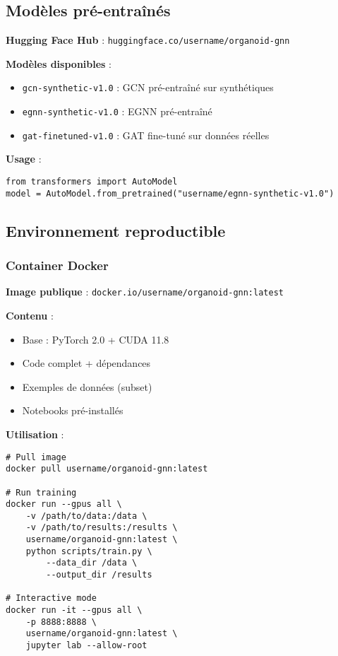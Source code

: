 \subsection{Modèles pré-entraînés}

\textbf{Hugging Face Hub} : \texttt{huggingface.co/username/organoid-gnn}

\textbf{Modèles disponibles} :
\begin{itemize}
    \item \texttt{gcn-synthetic-v1.0} : GCN pré-entraîné sur synthétiques
    \item \texttt{egnn-synthetic-v1.0} : EGNN pré-entraîné
    \item \texttt{gat-finetuned-v1.0} : GAT fine-tuné sur données réelles
\end{itemize}

\textbf{Usage} :
\begin{verbatim}
from transformers import AutoModel
model = AutoModel.from_pretrained("username/egnn-synthetic-v1.0")
\end{verbatim}

\subsection{Environnement reproductible}

\subsubsection{Container Docker}

\textbf{Image publique} : \texttt{docker.io/username/organoid-gnn:latest}

\textbf{Contenu} :
\begin{itemize}
    \item Base : PyTorch 2.0 + CUDA 11.8
    \item Code complet + dépendances
    \item Exemples de données (subset)
    \item Notebooks pré-installés
\end{itemize}

\textbf{Utilisation} :
\begin{verbatim}
# Pull image
docker pull username/organoid-gnn:latest

# Run training
docker run --gpus all \
    -v /path/to/data:/data \
    -v /path/to/results:/results \
    username/organoid-gnn:latest \
    python scripts/train.py \
        --data_dir /data \
        --output_dir /results

# Interactive mode
docker run -it --gpus all \
    -p 8888:8888 \
    username/organoid-gnn:latest \
    jupyter lab --allow-root
\end{verbatim}

